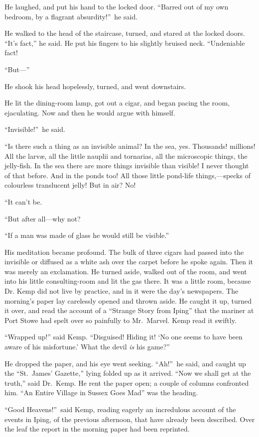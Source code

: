 He laughed, and put his hand to the locked door. “Barred out of my own bedroom, by a flagrant absurdity!”\ he said.

He walked to the head of the staircase, turned, and stared at the locked doors. “It’s fact,” he said. He put his fingers to his slightly bruised neck. “Undeniable fact!

“But—”

He shook his head hopelessly, turned, and went downstairs.

He lit the dining-room lamp, got out a cigar, and began pacing the room, ejaculating. Now and then he would argue with himself.

“Invisible!”\ he said.

“Is there such a thing as an invisible animal? In the sea, yes. Thousands! millions! All the larvæ, all the little nauplii and tornarias, all the microscopic things, the jelly-fish. In the sea there are more things invisible than visible! I never thought of that before. And in the ponds too! All those little pond-life things,—specks of colourless translucent jelly! But in air? No!

“It can’t be.

“But after all—why not?

“If a man was made of glass he would still be visible.”

His meditation became profound. The bulk of three cigars had passed into the invisible or diffused as a white ash over the carpet before he spoke again. Then it was merely an exclamation. He turned aside, walked out of the room, and went into his little consulting-room and lit the gas there. It was a little room, because Dr. Kemp did not live by practice, and in it were the day’s newspapers. The morning’s paper lay carelessly opened and thrown aside. He caught it up, turned it over, and read the account of a “Strange Story from Iping” that the mariner at Port Stowe had spelt over so painfully to Mr.\ Marvel. Kemp read it swiftly.

“Wrapped up!” said Kemp. “Disguised! Hiding it! ‘No one seems to have been aware of his misfortune.’ What the devil \emph{is} his game?”

He dropped the paper, and his eye went seeking. “Ah!”\ he said, and caught up the “St.\ James’ Gazette,” lying folded up as it arrived. “Now we shall get at the truth,” said Dr.\ Kemp. He rent the paper open; a couple of columns confronted him. “An Entire Village in Sussex Goes Mad” was the heading.

“Good Heavens!”\ said Kemp, reading eagerly an incredulous account of the events in Iping, of the previous afternoon, that have already been described. Over the leaf the report in the morning paper had been reprinted.

